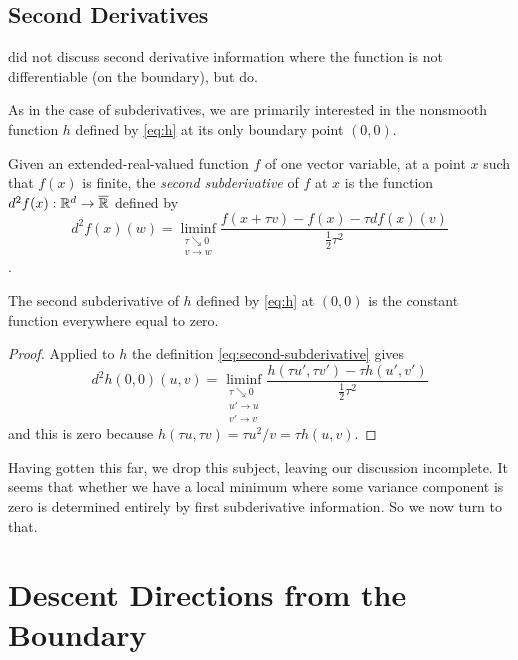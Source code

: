 \subsection{Second Derivatives}

\citet{reaster-tr,reaster} did not discuss second derivative information
where the function is not differentiable (on the boundary), but
\citet[Chapter~13]{rockafellar-wets} do.

As in the case of subderivatives, we are primarily interested in the nonsmooth
function $h$ defined by \eqref{eq:h} at its only boundary point $(0, 0)$.

Given an extended-real-valued function $f$ of one vector variable,
at a point $x$ such that $f(x)$ is finite,
the \emph{second subderivative} of $f$ at $x$ is
the function $d^2 f(x) : \mathbb{R}^d \to \overline{\mathbb{R}}$ defined by
\begin{equation} \label{eq:second-subderivative}
   d^2 f(x)(w) = \liminf_{\substack{\tau \searrow 0 \\ v \to w}}
   \frac{f(x + \tau v) - f(x) - \tau d f(x)(v)}{\frac{1}{2} \tau^2}
\end{equation}
\citep[Definition~13.3]{rockafellar-wets}.

\begin{theorem} \label{th:second-subderivative}
The second subderivative of $h$ defined by \eqref{eq:h} at $(0, 0)$ is
the constant function everywhere equal to zero.
\end{theorem}
\begin{proof}
Applied to $h$ the definition \eqref{eq:second-subderivative} gives
\begin{equation*}
   d^2 h(0, 0)(u, v)
   = \liminf_{\substack{\tau \searrow 0 \\ u' \to u \\ v' \to v}}
   \frac{h(\tau u', \tau v') - \tau h(u', v')}{\frac{1}{2} \tau^2}
\end{equation*}
and this is zero because $h(\tau u, \tau v) = \tau u^2 / v = \tau h(u, v)$.
\end{proof}

Having gotten this far, we drop this subject, leaving our discussion
incomplete.  It seems that whether we have a local minimum where some
variance component is zero is determined entirely by first subderivative
information.  So we now turn to that.

\section{Descent Directions from the Boundary}

